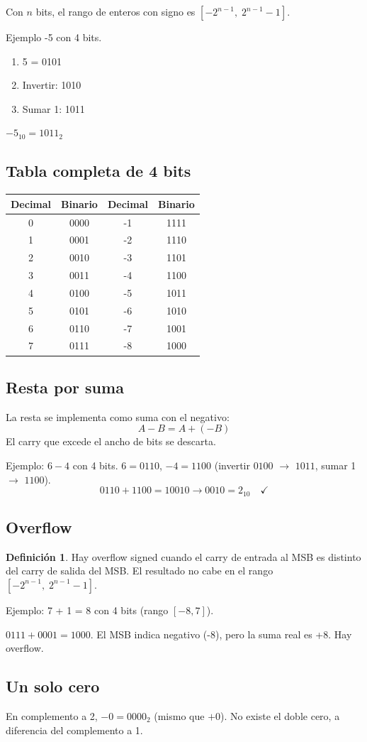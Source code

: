 \documentclass[10pt,a4paper]{article}
\theoremstyle{definition}
\newtheorem{definicion}{Definición}[section]
\begin{document}
Con $n$ bits, el rango de enteros con signo es
$[-2^{n-1},\; 2^{n-1} - 1]$.

Ejemplo -5 con 4 bits.

\begin{enumerate}
    \item 5 = 0101
    \item Invertir: 1010
    \item Sumar 1: 1011
\end{enumerate}

$-5_{10} = 1011_2$ \checkmark

\subsection{Tabla completa de 4 bits}

\begin{center}
\begin{tabular}{c|c||c|c}
    \toprule
    Decimal & Binario & Decimal & Binario \\
    \midrule
    0 & 0000 & -1 & 1111 \\
    1 & 0001 & -2 & 1110 \\
    2 & 0010 & -3 & 1101 \\
    3 & 0011 & -4 & 1100 \\
    4 & 0100 & -5 & 1011 \\
    5 & 0101 & -6 & 1010 \\
    6 & 0110 & -7 & 1001 \\
    7 & 0111 & -8 & 1000 \\
    \bottomrule
\end{tabular}
\end{center}

\subsection{Resta por suma}

La resta se implementa como suma con el negativo:
\[
    A - B = A + (-B)
\]
El carry que excede el ancho de bits se descarta. 

Ejemplo: $6 - 4$ con 4 bits.
$6 = 0110$, $-4 = 1100$ (invertir $0100$ $\to$ $1011$, sumar 1 $\to$ $1100$).
\[
    0110 + 1100 = 10010 \to 0010 = 2_{10} \quad \checkmark
\]
\subsection{Overflow}

\begin{definicion}
    Hay overflow signed cuando el carry de entrada al MSB es distinto
    del carry de salida del MSB. El resultado no cabe en el rango
    $[-2^{n-1},\; 2^{n-1} - 1]$.
\end{definicion}

Ejemplo: 7 + 1 = 8 con 4 bits (rango $[-8, 7]$).

$0111 + 0001 = 1000$. El MSB indica negativo (-8), pero la 
suma real es +8. Hay overflow.

\subsection{Un solo cero}

En complemento a 2, $-0 = 0000_2$ (mismo que $+0$).
No existe el doble cero, a diferencia del complemento a 1.
\end{document}
